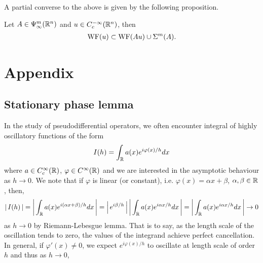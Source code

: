 \documentclass[12pt]{article}
\begin{document}
A partial converse to the above is given by the following proposition. \\

\begin{fprop}
    Let $A \in \Psi^m_\infty({\mathbb R}^n)$ and $u \in C^{- \infty}_c({\mathbb R}^n)$, then 
    \begin{align*}
    \mathrm{WF}(u) \subset \mathrm{WF}(Au) \cup \Sigma^m(A).
    \end{align*}
\end{fprop}

\section{Appendix}
\subsection{Stationary phase lemma} 
In the study of pseudodifferential operators, we often encounter integral of highly oscillatory functions of the form
    \begin{align*}
    I(h) = \int_{\mathbb R} a(x) e^{i \varphi(x) /h} dx
    \end{align*}
where $a \in C^\infty_c({\mathbb R})$, $\varphi \in C^\infty({\mathbb R})$ and we are interested in the asymptotic behaviour as $h \to 0$. We note that if $\varphi$ is linear (or constant), i.e. $\varphi(x) = \alpha x+ \beta$, $\alpha, \beta \in {\ensuremath {\mathbb R}}$, then, 
\begin{align*}
   \left|\, I(h)\,\right| = \left|\, \int_{\mathbb R} a(x) e^{i (\alpha x + \beta) /h} dx\,\right| = \left|\, e^{i \beta/h}\,\right| \left|\, \int_{\mathbb R} a(x) e^{i \alpha x /h} dx\,\right| =  \left|\, \int_{\mathbb R} a(x) e^{i \alpha x /h} dx\,\right| \to 0
\end{align*}
as $h \to 0$ by Riemann-Lebesgue lemma. That is to say, as the length scale of the oscillation tends to zero, the values of the integrand achieve perfect cancellation. In general, if $\varphi'(x) \neq 0$, we expect $e^{i\varphi(x)/h}$ to oscillate at length scale of order $h$ and thus as $h \to 0$, 









\end{document}
